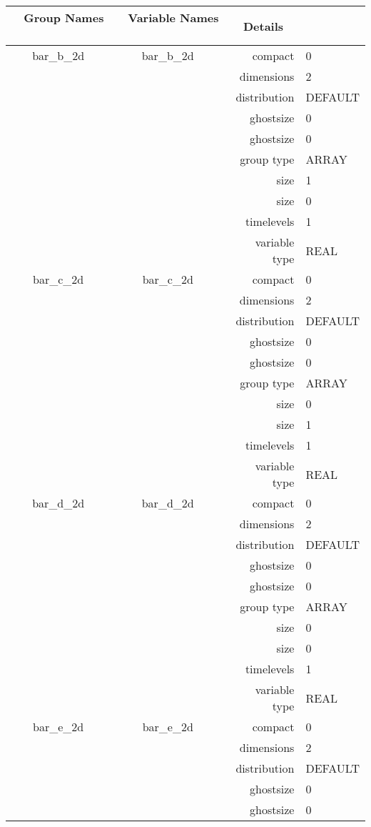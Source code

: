 \begin{tabular*}{150mm}{|c|c@{\extracolsep{\fill}}|rl|} \hline 
~ {\bf Group Names} ~ & ~ {\bf Variable Names} ~  &{\bf Details} ~ & ~ \\ 
\hline 
bar\_b\_2d & bar\_b\_2d & compact & 0 \\ 
 &  & dimensions & 2 \\ 
 &  & distribution & DEFAULT \\ 
 &  & ghostsize & 0 \\ 
& ~ & ghostsize & 0 \\ 
 &  & group type & ARRAY \\ 
 &  & size & 1 \\ 
& ~ & size & 0 \\ 
 &  & timelevels & 1 \\ 
 &  & variable type & REAL \\ 
\hline 
bar\_c\_2d & bar\_c\_2d & compact & 0 \\ 
 &  & dimensions & 2 \\ 
 &  & distribution & DEFAULT \\ 
 &  & ghostsize & 0 \\ 
& ~ & ghostsize & 0 \\ 
 &  & group type & ARRAY \\ 
 &  & size & 0 \\ 
& ~ & size & 1 \\ 
 &  & timelevels & 1 \\ 
 &  & variable type & REAL \\ 
\hline 
bar\_d\_2d & bar\_d\_2d & compact & 0 \\ 
 &  & dimensions & 2 \\ 
 &  & distribution & DEFAULT \\ 
 &  & ghostsize & 0 \\ 
& ~ & ghostsize & 0 \\ 
 &  & group type & ARRAY \\ 
 &  & size & 0 \\ 
& ~ & size & 0 \\ 
 &  & timelevels & 1 \\ 
 &  & variable type & REAL \\ 
\hline 
bar\_e\_2d & bar\_e\_2d & compact & 0 \\ 
 &  & dimensions & 2 \\ 
 &  & distribution & DEFAULT \\ 
 &  & ghostsize & 0 \\ 
& ~ & ghostsize & 0 \\ 

\end{tabular*}
